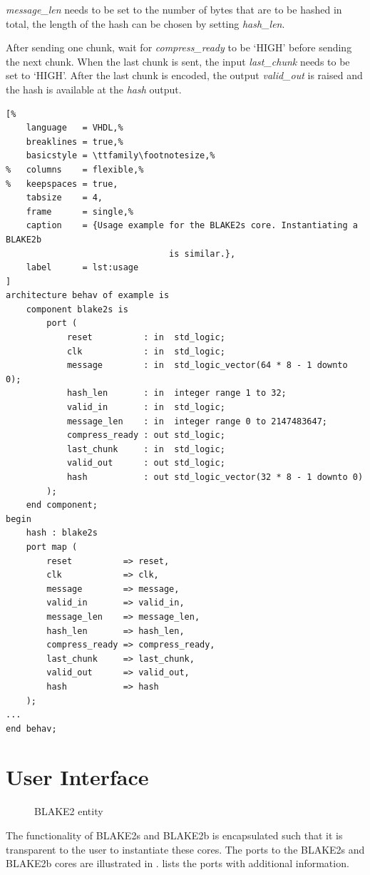 \documentclass[%
	a4paper,
]
{article}
\begin{document}
\emph{message_len} needs to be set to the number of bytes that are to be
hashed in total, the length of the hash can be chosen by setting
\emph{hash_len}.

After sending one chunk, wait for \emph{compress_ready} to be `HIGH' before
sending the next chunk. When the last chunk is sent, the input
\emph{last_chunk} needs to be set to `HIGH'. After the last chunk is
encoded, the output \emph{valid_out} is raised and the hash is available at the
\emph{hash} output.

\begin{lstlisting}[%
	language   = VHDL,%
	breaklines = true,%
	basicstyle = \ttfamily\footnotesize,%
%	columns    = flexible,%
%	keepspaces = true,
	tabsize    = 4,
	frame      = single,%
	caption    = {Usage example for the BLAKE2s core. Instantiating a BLAKE2b
								is similar.},
	label      = lst:usage
]
architecture behav of example is
	component blake2s is
		port (
			reset          : in  std_logic;
			clk            : in  std_logic;
			message        : in  std_logic_vector(64 * 8 - 1 downto 0);
			hash_len       : in  integer range 1 to 32;
			valid_in       : in  std_logic;
			message_len    : in  integer range 0 to 2147483647;
			compress_ready : out std_logic;
			last_chunk     : in  std_logic;
			valid_out      : out std_logic;
			hash           : out std_logic_vector(32 * 8 - 1 downto 0)
		);
	end component;
begin
	hash : blake2s
	port map (
		reset          => reset,
		clk            => clk,
		message        => message,
		valid_in       => valid_in,
		message_len    => message_len,
		hash_len       => hash_len,
		compress_ready => compress_ready,
		last_chunk     => last_chunk,
		valid_out      => valid_out,
		hash           => hash
	);
...
end behav;
\end{lstlisting}
%
%
\section{User Interface}
\label{sec:user-interface}
%

\begin{figure}[h!]
	\centering
	\small
	
	\caption{BLAKE2 entity}
	\label{fig:blake-entity}
\end{figure}

The functionality of BLAKE2s and BLAKE2b is encapsulated such that it is
transparent to the user to instantiate these cores. The ports to the
BLAKE2s and BLAKE2b cores are illustrated in .
 lists the ports with additional information.
\end{document}
